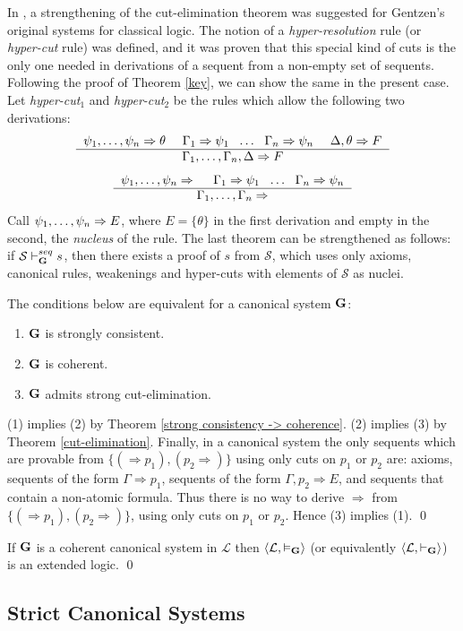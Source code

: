 \documentclass{LMCS}
\theoremstyle{remark}
\newcommand{\lp}{\mathcal{L}}
\newcommand{\Ss}{\mathcal{S}}
\newcommand{\G}{{\bf G}}
\newcommand{\psitil}{\psi_1 \til \psi_n}
\newcommand{\be}{\begin{enumerate}[(1)]}
\newcommand{\ee}{\end{enumerate}}
\newcommand{\Ra}{\Rightarrow}
\newcommand{\g}{\Gamma}
\newcommand{\de}{\Delta}
\newcommand{\vd}{\vdash}
\newcommand{\vD}{\vDash}
\newcommand{\tup}[1]{\langle #1 \rangle}
\newcommand{\derb}[3]{
    \begin{tabular}{c}
    $ #1 \ \ \ \ #2 $ \\ \hline
    $ #3 $ \\
    \end{tabular}}
\newcommand{\derc}[4]{
    \begin{tabular}{c}
    $ #1 \ \ \ \ #2 \ \ \ \ #3 $ \\ \hline
    $ #4 $ \\
    \end{tabular}}
\begin{document}
\begin{enumerate}[(a)]
\begin{enumerate}[\bf(a):]
\begin{rem}
\label{hyper-cut}
In \cite{Av93}, a strengthening of the cut-elimination theorem was suggested
for Gentzen's original systems for classical logic. 
The notion of a {\em hyper-resolution} rule (or {\em hyper-cut} rule) was defined,
and it was proven that this special kind of cuts is the only one needed in derivations
of a sequent from a non-empty set of sequents.
Following the proof of Theorem \ref{key}, we can show the same in the present case.
Let {\em hyper-cut}$_1$ and {\em hyper-cut}$_2$ be the rules which allow the following two derivations:
\[
\derc{\psitil\Ra \theta}{\g_1\Ra\psi_1 \ \ \ldots \ \ \g_n\Ra\psi_n}{\de,\theta\Ra F}
{\g_1 \til \g_n,\de\Ra F}
\]
\[
\derb{\psitil\Ra}{\g_1\Ra\psi_1 \ \ \ldots \ \ \g_n\Ra\psi_n}
{\g_1 \til \g_n\Ra}
\]
Call $\psitil \Ra E$, where $E=\{\theta\}$ in the 
first derivation and empty in the second,
the {\em nucleus} of the rule.
The last theorem can be strengthened as follows:
if ${\Ss\vd_\G^{seq}s}$,
then there exists a proof of $s$ from $\Ss$,
which uses only axioms, canonical rules,
weakenings and hyper-cuts with elements of $\Ss$ as nuclei.
\end{rem}

\begin{cor}
\label{equivalences}
The conditions below are equivalent for a 
canonical system ${\G}$:
\be
\item ${\G}$ is strongly consistent.
\item ${\G}$ is coherent.
\item ${\G}$ admits strong cut-elimination.
\ee
\end{cor}
\proof
(1) implies (2) by Theorem \ref{strong consistency -> coherence}. 
(2) implies (3) by Theorem \ref{cut-elimination}. 
Finally, in a canonical system
the only sequents which are provable from 
$\{(\Ra p_1),(p_2\Ra)\}$ using only cuts on $p_1$ or $p_2$ are: 
axioms, sequents of the form $\g\Ra p_1$,
sequents of the form $\g,p_2\Ra E$, and sequents that contain a non-atomic formula.
Thus there is no way to derive $\Ra$ from $\{(\Ra p_1),(p_2\Ra)\}$,
using only cuts on $p_1$ or $p_2$. Hence (3) implies (1).
\qed

\begin{cor}
If ${\G}$ is a coherent canonical system in $\lp$ then 
$\tup{\lp,\vD_{\G}}$ (or equivalently $\tup{\lp,\vd_{\G}}$) is an extended logic.
\qed
\end{cor}

\subsection{Strict Canonical Systems}


\end{enumerate}
\end{enumerate}
\end{document}
